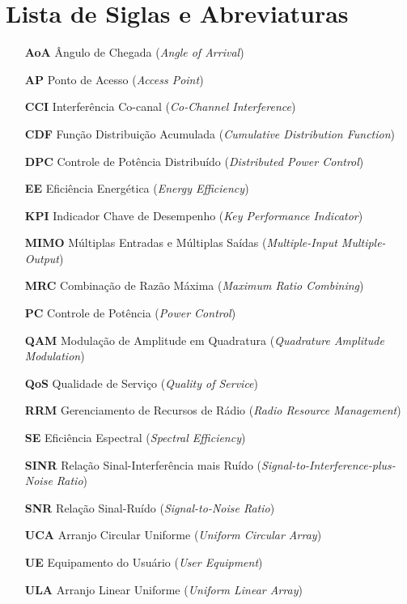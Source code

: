 \section*{Lista de Siglas e Abreviaturas}

\begin{itemize}[leftmargin=3cm, labelsep=0.5cm]
    \item[\textbf{AoA}] Ângulo de Chegada (\textit{Angle of Arrival})
    \item[\textbf{AP}] Ponto de Acesso (\textit{Access Point})
    \item[\textbf{CCI}] Interferência Co-canal (\textit{Co-Channel Interference})
    \item[\textbf{CDF}] Função Distribuição Acumulada (\textit{Cumulative Distribution Function})
    \item[\textbf{DPC}] Controle de Potência Distribuído (\textit{Distributed Power Control})
    \item[\textbf{EE}] Eficiência Energética (\textit{Energy Efficiency})
    \item[\textbf{KPI}] Indicador Chave de Desempenho (\textit{Key Performance Indicator})
    \item[\textbf{MIMO}] Múltiplas Entradas e Múltiplas Saídas (\textit{Multiple-Input Multiple-Output})
    \item[\textbf{MRC}] Combinação de Razão Máxima (\textit{Maximum Ratio Combining})
    \item[\textbf{PC}] Controle de Potência (\textit{Power Control})
    \item[\textbf{QAM}] Modulação de Amplitude em Quadratura (\textit{Quadrature Amplitude Modulation})
    \item[\textbf{QoS}] Qualidade de Serviço (\textit{Quality of Service})
    \item[\textbf{RRM}] Gerenciamento de Recursos de Rádio (\textit{Radio Resource Management})
    \item[\textbf{SE}] Eficiência Espectral (\textit{Spectral Efficiency})
    \item[\textbf{SINR}] Relação Sinal-Interferência mais Ruído (\textit{Signal-to-Interference-plus-Noise Ratio})
    \item[\textbf{SNR}] Relação Sinal-Ruído (\textit{Signal-to-Noise Ratio})
    \item[\textbf{UCA}] Arranjo Circular Uniforme (\textit{Uniform Circular Array})
    \item[\textbf{UE}] Equipamento do Usuário (\textit{User Equipment})
    \item[\textbf{ULA}] Arranjo Linear Uniforme (\textit{Uniform Linear Array})
\end{itemize}

